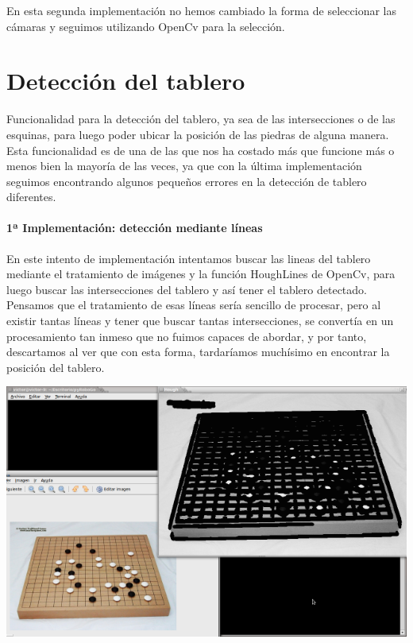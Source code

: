 \documentclass[12pt,a4paper]{report}
\begin{document}
En esta segunda implementación no hemos cambiado la forma de seleccionar las
cámaras y seguimos utilizando OpenCv para la selección. 




\section{Detección del tablero} 

Funcionalidad para la detección del tablero, ya sea de las intersecciones o de
las esquinas, para luego poder ubicar la posición de las piedras de alguna
manera. Esta funcionalidad es de una de las que nos ha costado más que funcione
más o menos bien la mayoría de las veces, ya que con la última implementación
seguimos encontrando algunos pequeños errores en la detección de tablero
diferentes. 

\paragraph{1ª Implementación: detección mediante líneas}

En este intento de implementación intentamos buscar las lineas del tablero 
mediante el tratamiento de imágenes y la función HoughLines de OpenCv, para 
luego buscar las intersecciones del tablero y así tener el tablero detectado. 
Pensamos que el tratamiento de esas líneas sería sencillo de procesar, pero al
existir tantas líneas y tener que buscar tantas intersecciones, se convertía en
un procesamiento tan inmeso que no fuimos capaces de abordar, y por tanto,
descartamos al ver que con esta forma, tardaríamos muchísimo en encontrar la
posición del tablero.

\includegraphics[scale=0.6]{detect-lineas.png}
\end{document}
